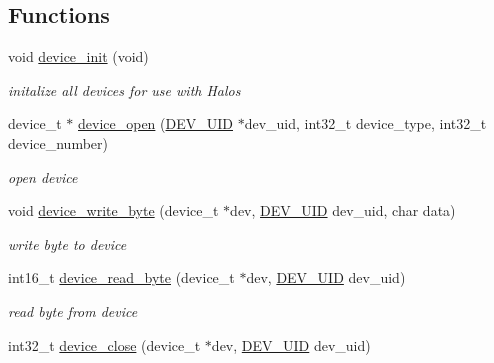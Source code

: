 \subsection*{Functions}
\begin{CompactItemize}
\item 
\hypertarget{group___d_e_v_i_c_e___a_p_i_g811bf83f91422a12605214335366a38d}{
void \hyperlink{group___d_e_v_i_c_e___a_p_i_g811bf83f91422a12605214335366a38d}{device\_\-init} (void)}
\label{group___d_e_v_i_c_e___a_p_i_g811bf83f91422a12605214335366a38d}

\begin{CompactList}\small\item\em initalize all devices for use with Halos \item\end{CompactList}\item 
device\_\-t $\ast$ \hyperlink{group___d_e_v_i_c_e___a_p_i_gb4bf1da93b05a0e9b89351a6f14b8d86}{device\_\-open} (\hyperlink{group___d_e_v_i_c_e___a_p_i_g9f427f7fc1dc07b788af60c2aaa6b8d3}{DEV\_\-UID} $\ast$dev\_\-uid, int32\_\-t device\_\-type, int32\_\-t device\_\-number)
\begin{CompactList}\small\item\em open device \item\end{CompactList}\item 
void \hyperlink{group___d_e_v_i_c_e___a_p_i_gdbf6ebde9656a7eee490f554ac3dcbea}{device\_\-write\_\-byte} (device\_\-t $\ast$dev, \hyperlink{group___d_e_v_i_c_e___a_p_i_g9f427f7fc1dc07b788af60c2aaa6b8d3}{DEV\_\-UID} dev\_\-uid, char data)
\begin{CompactList}\small\item\em write byte to device \item\end{CompactList}\item 
int16\_\-t \hyperlink{group___d_e_v_i_c_e___a_p_i_g61a1f3d441ef22c1fe3d42420134c51d}{device\_\-read\_\-byte} (device\_\-t $\ast$dev, \hyperlink{group___d_e_v_i_c_e___a_p_i_g9f427f7fc1dc07b788af60c2aaa6b8d3}{DEV\_\-UID} dev\_\-uid)
\begin{CompactList}\small\item\em read byte from device \item\end{CompactList}\item 
int32\_\-t \hyperlink{group___d_e_v_i_c_e___a_p_i_gca0e04a4b3f9379a4d094ca2dcd4388b}{device\_\-close} (device\_\-t $\ast$dev, \hyperlink{group___d_e_v_i_c_e___a_p_i_g9f427f7fc1dc07b788af60c2aaa6b8d3}{DEV\_\-UID} dev\_\-uid)

\end{CompactItemize}
